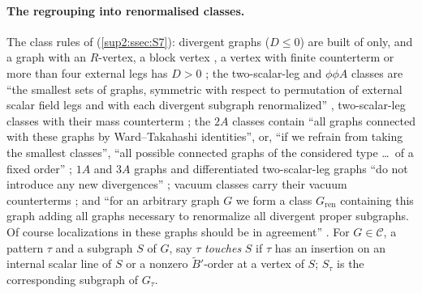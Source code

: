 \paragraph{The regrouping into renormalised classes.} The class rules of \cite[Sect.~2]{Ba3} (\cref{sup2:ssec:S7}): divergent graphs ($D\le0$) are built of \cite[(1.6)--(1.8), (1.10)]{Ba3} only, and a graph with an $R$-vertex, a block vertex \cite[(1.13)--(1.15)]{Ba3}, a \cite[(1.7)]{Ba3} vertex with finite counterterm or more than four external legs has $D>0$ \cite[Cor.~2.3]{Ba3}; the two-scalar-leg and $\phi\phi A$ classes are ``the smallest sets of graphs, symmetric with respect to permutation of external scalar field legs and with each divergent subgraph renormalized'' \cite[p.~429]{Ba3}, two-scalar-leg classes with their mass counterterm \cite[p.~430]{Ba3}; the $2A$ classes contain ``all graphs connected with these graphs by Ward--Takahashi identities'', or, ``if we refrain from taking the smallest classes'', ``all possible connected graphs of the considered type \dots\ of a fixed order'' \cite[p.~431]{Ba3}; $1A$ and $3A$ graphs and differentiated two-scalar-leg graphs ``do not introduce any new divergences'' \cite[p.~431]{Ba3}; vacuum classes carry their vacuum counterterms \cite[p.~432]{Ba3}; and ``for an arbitrary graph $G$ we form a class $G_{\mathrm{ren}}$ containing this graph adding all graphs necessary to renormalize all divergent proper subgraphs. Of course localizations in these graphs should be in agreement'' \cite[p.~432]{Ba3}. For $G\in\mathcal C$, a pattern $\tau$ and a subgraph $S$ of $G$, say $\tau$ \emph{touches} $S$ if $\tau$ has an insertion on an internal scalar line of $S$ or a nonzero $\tilde B'$-order at a vertex of $S$; $S_\tau$ is the corresponding subgraph of $G_\tau$.

